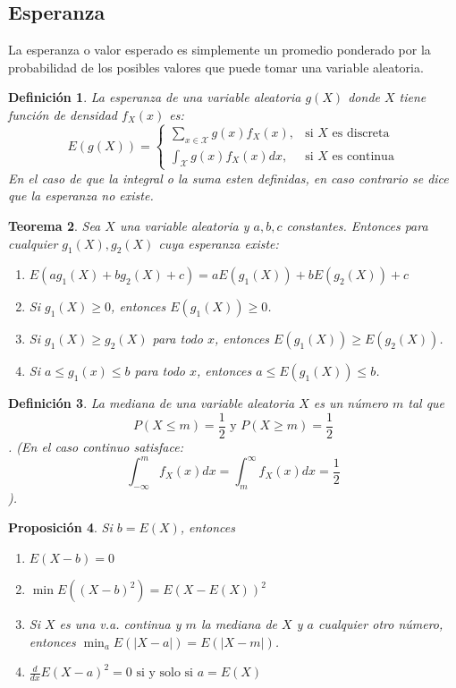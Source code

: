 \documentclass[14pt]{extarticle}
\newtheorem{theorem}{Teorema}[section]
\newtheorem{proposition}[theorem]{Proposición}
\newtheorem{definition}[theorem]{Definición}
\begin{document}
\subsection{Esperanza}
La esperanza o valor esperado es simplemente un promedio ponderado por la probabilidad de los posibles valores que puede tomar una variable aleatoria.

\begin{definition}
    La esperanza de una variable aleatoria $g(X)$ donde $X$ tiene función de densidad $f_X(x)$ es:
    \[
        E(g(X)) = \begin{cases}
            \sum_{x \in \mathcal{X}} g(x) f_X(x), & \text{si } X \text{ es discreta}\\
            \int_\mathcal{X} g(x) f_X(x) dx, & \text{si } X \text{ es continua}
        \end{cases}
    \]
    En el caso de que la integral o la suma esten definidas, en caso contrario se dice que la esperanza no existe.
\end{definition}

\begin{theorem}
    Sea $X$ una variable aleatoria y $a, b, c$ constantes. Entonces para cualquier $g_1(X), g_2(X)$ cuya esperanza existe:
    \begin{enumerate}
        \item $E(ag_1(X) + bg_2(X) + c) = aE(g_1(X)) + bE(g_2(X)) + c$
        \item Si $g_1(X) \geq 0$, entonces $E(g_1(X)) \geq 0$.
        \item Si $g_1(X) \geq g_2(X)$ para todo $x$, entonces $E(g_1(X)) \geq E(g_2(X))$.
        \item Si $a \leq g_1(x) \leq b$ para todo $x$, entonces $a \leq E(g_1(X)) \leq b$.
    \end{enumerate}
\end{theorem}

\begin{definition}
    La mediana de una variable aleatoria $X$ es un número $m$ tal que $$P(X \leq m) = \frac{1}{2} \text{ y } P(X \geq m) = \frac{1}{2}$$.
    (En el caso continuo satisface:
    $$ \int_{-\infty}^m f_X(x) dx = \int_m^\infty f_X(x) dx = \frac{1}{2} $$
    ).
\end{definition}

\begin{proposition}
    Si $b=E(X)$, entonces 
    \begin{enumerate}
        \item $E(X-b) = 0$
        \item $\min E((X-b)^2) = E(X-E(X))^2$
        \item Si $X$ es una v.a. continua y $m$ la mediana de $X$ y $a$ cualquier otro número, entonces $\min_a E(|X-a|) = E(|X-m|)$.
        \item $\frac{d}{dx}E(X-a)^2 = 0 \text{ si y solo si } a = E(X)$
    \end{enumerate}
\end{proposition}
\end{document}
